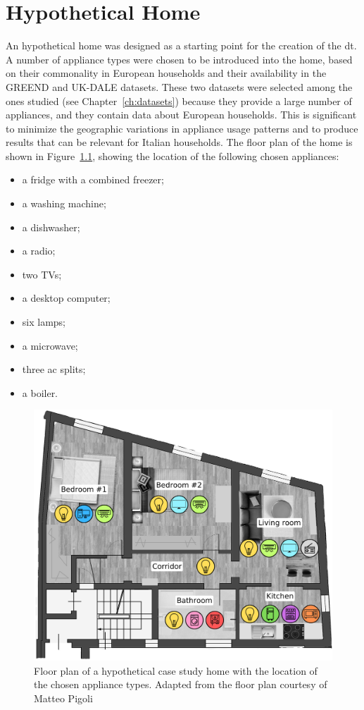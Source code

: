 \chapter{Hypothetical Home}\label{ch:hypothetical_home}

An hypothetical home was designed as a starting point for the creation of the \acrshort{dt}. A number of appliance types were chosen to be introduced into the home, based on their commonality in European households and their availability in the GREEND and UK-DALE datasets. These two datasets were selected among the ones studied (see Chapter~\ref{ch:datasets}) because they provide a large number of appliances, and they contain data about European households. This is significant to minimize the geographic variations in appliance usage patterns and to produce results that can be relevant for Italian households. The floor plan of the home is shown in Figure~\ref{fig:home_floor_plan}, showing the location of the following chosen appliances:
\begin{itemize}
  \item a fridge with a combined freezer;
  \item a washing machine;
  \item a dishwasher;
  \item a radio;
  \item two TVs;
  \item a desktop computer;
  \item six lamps;
  \item a microwave;
  \item three \acrshort{ac} splits;
  \item a boiler.
\end{itemize}

\begin{figure}
  \centering
  \includegraphics[width=0.7\linewidth]{images/floor_plan.png}
  \caption[Floor plan of a hypothetical case study home with the location of the chosen appliance types]{Floor plan of a hypothetical case study home with the location of the chosen appliance types. Adapted from the floor plan courtesy of Matteo Pigoli}%
  \label{fig:home_floor_plan}
\end{figure}

